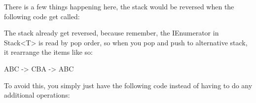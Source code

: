 

There is a few things happening here, the stack would be reversed when the following code get called:



The stack already get reversed, because remember, the IEnumerator in Stack<T> is read by pop order, so when you pop and push to alternative stack, it rearrange the items like so:

ABC -> CBA -> ABC

To avoid this, you simply just have the following code instead of having to do any additional operations:


